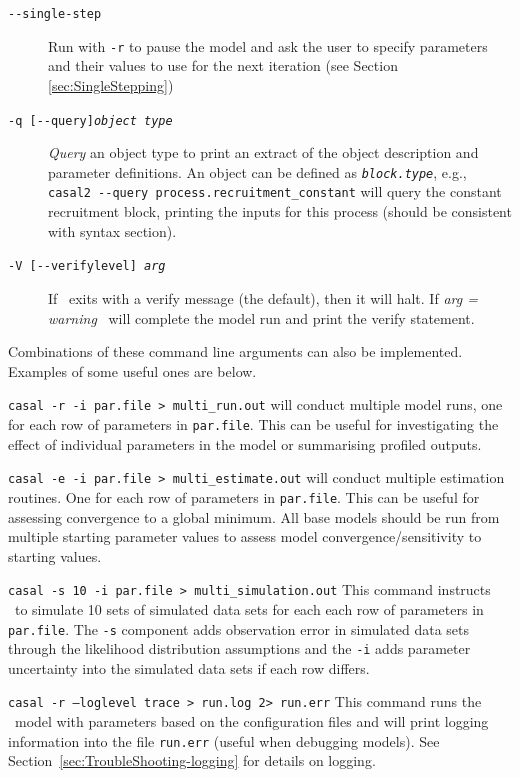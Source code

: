 \begin{description}
\item [\texttt{-{}-single-step}] Run with \texttt{-r} to pause the model and ask the user to specify parameters and their values to use for the next iteration (see Section \ref{sec:SingleStepping})
\item [\texttt{-q [-{}-query]\emph{object type}}] \emph{Query} an object type to print an extract of the object description and parameter definitions.  An object can be defined as \texttt{\emph{block.type}}, e.g., \texttt{casal2 -{}-query process.recruitment\_constant} will query the constant recruitment block, printing the inputs for this process (should be consistent with syntax section).
\item [\texttt{-V [-{}-verifylevel] \emph{arg}}] If \CNAME\ exits with a verify message (the default), then it will halt. If \emph{arg = warning} \CNAME\ will complete the model run and print the verify statement.
\end{description}
%
Combinations of these command line arguments can also be implemented. Examples of some useful ones are below.
\begin{description}
	\item \texttt{casal -r -i par.file > multi\_run.out} will conduct multiple model runs, one for each row of parameters in \texttt{par.file}. This can be useful for investigating the effect of individual parameters in the model or summarising profiled outputs.
	
	\item \texttt{casal -e -i par.file > multi\_estimate.out} will conduct multiple estimation routines. One for each row of parameters in \texttt{par.file}. This can be useful for assessing convergence to a global minimum. All base models should be run from multiple starting parameter values to assess model convergence/sensitivity to starting values.
	
	\item \texttt{casal -s 10 -i par.file > multi\_simulation.out} This command instructs \CNAME\ to simulate 10 sets of simulated data sets for each each row of parameters in \texttt{par.file}. The \texttt{-s} component adds observation error in simulated data sets through the likelihood distribution assumptions and the \texttt{-i} adds parameter uncertainty into the simulated data sets if each row differs.
	
	\item \texttt{casal -r --loglevel trace > run.log 2> run.err} This command runs the \CNAME\ model with parameters based on the configuration files and will print logging information into the file \texttt{run.err} (useful when debugging models). See Section~\ref{sec:TroubleShooting-logging} for details on logging.
\end{description}


